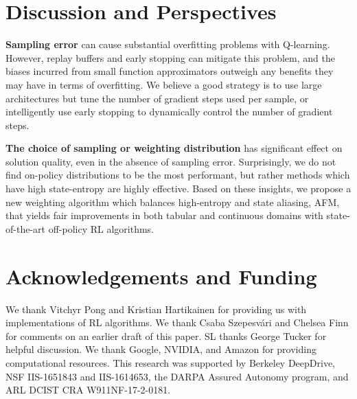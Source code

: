 \section{Discussion and Perspectives}



\textbf{Sampling error} can cause substantial overfitting problems with Q-learning. However, replay buffers and early stopping can mitigate this problem, and the biases incurred from small function approximators outweigh any benefits they may have in terms of overfitting. We believe a good strategy is to use large architectures but tune the number of gradient steps used per sample, or intelligently use early stopping to dynamically control the number of gradient steps. 

\textbf{The choice of sampling or weighting distribution} has significant effect on solution quality, even in the absence of sampling error. Surprisingly, we do not find on-policy distributions to be the most performant, but rather methods which have high state-entropy are highly effective. Based on these insights, we propose a new weighting algorithm which balances high-entropy and state aliasing, AFM, that yields fair improvements in both tabular and continuous domains with state-of-the-art off-policy RL algorithms.




\section*{Acknowledgements and Funding}
We thank Vitchyr Pong and Kristian Hartikainen for providing us with implementations of RL algorithms. We thank Csaba Szepesv\'{a}ri and Chelsea Finn for comments on an earlier draft of this paper. SL thanks George Tucker for helpful discussion. We thank Google, NVIDIA, and Amazon
for providing computational resources. This research was supported by Berkeley DeepDrive, NSF IIS-1651843 and IIS-1614653, the DARPA Assured Autonomy program, and ARL DCIST CRA W911NF-17-2-0181.
